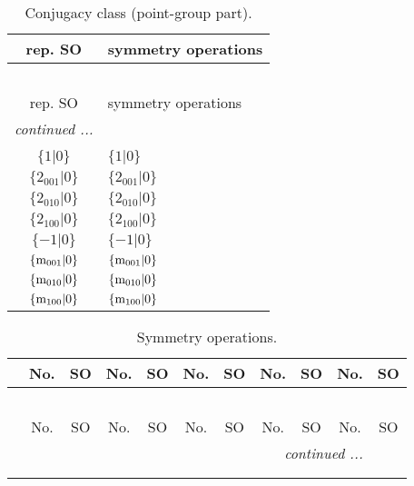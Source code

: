\documentclass[fleqn,10pt,landscape]{article}
\begin{document}
\begin{itemize}
\begin{center}
\renewcommand{\arraystretch}{1.3}
\begin{longtable}{c|l}
\caption{Conjugacy class (point-group part).}
 \\
 \hline \hline
rep. SO & symmetry operations \\ \hline \endfirsthead

\multicolumn{1}{l}{\tablename\ \thetable{}} \\
 \hline \hline
rep. SO & symmetry operations \\ \hline \endhead

 \hline \hline
\multicolumn{1}{r}{\footnotesize\it continued ...} \\ \endfoot

 \hline \hline
\multicolumn{1}{r}{} \\ \endlastfoot

$\{1|0\}$ & $\{1|0\}$ \\ \hline
$\{2{}_{001}|0\}$ & $\{2{}_{001}|0\}$ \\ \hline
$\{2{}_{010}|0\}$ & $\{2{}_{010}|0\}$ \\ \hline
$\{2{}_{100}|0\}$ & $\{2{}_{100}|0\}$ \\ \hline
$\{-1|0\}$ & $\{-1|0\}$ \\ \hline
$\{{\rm m}_{001}|0\}$ & $\{{\rm m}_{001}|0\}$ \\ \hline
$\{{\rm m}_{010}|0\}$ & $\{{\rm m}_{010}|0\}$ \\ \hline
$\{{\rm m}_{100}|0\}$ & $\{{\rm m}_{100}|0\}$ \\
\end{longtable}
\end{center}
\begin{center}
\renewcommand{\arraystretch}{1.3}
\begin{longtable}{c|cc|cc|cc|cc|cc}
\caption{Symmetry operations.}
 \\
 \hline \hline
 & No. & SO & No. & SO & No. & SO & No. & SO & No. & SO \\ \hline \endfirsthead

\multicolumn{10}{l}{\tablename\ \thetable{}} \\
 \hline \hline
 & No. & SO & No. & SO & No. & SO & No. & SO & No. & SO \\ \hline \endhead

 \hline \hline
\multicolumn{10}{r}{\footnotesize\it continued ...} \\ \endfoot

 \hline \hline
\multicolumn{10}{r}{} \\ \endlastfoot


\end{longtable}
\end{center}
\end{itemize}
\end{document}
